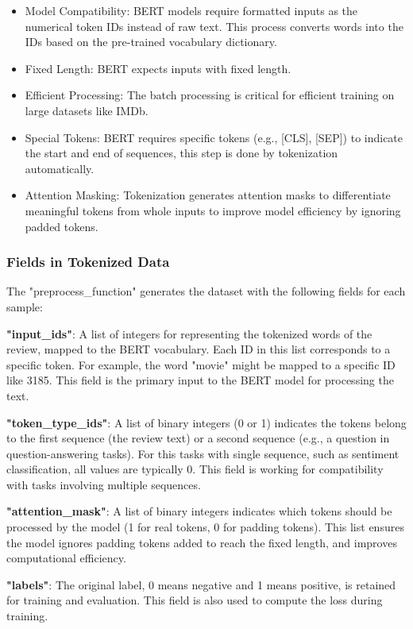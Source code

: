 \begin{itemize}
    \item Model Compatibility: BERT models require formatted inputs as the numerical token IDs instead of raw text. This process converts words into the IDs based on the pre-trained vocabulary dictionary.
    \item Fixed Length: BERT expects inputs with fixed length. 
    \item Efficient Processing: The batch processing is critical for efficient training on large datasets like IMDb.
    \item Special Tokens: BERT requires specific tokens (e.g., [CLS], [SEP]) to indicate the start and end of sequences, this step is done by tokenization automatically.
    \item Attention Masking: Tokenization generates attention masks to differentiate meaningful tokens from whole inputs to improve model efficiency by ignoring padded tokens.
\end{itemize}

\subsubsection*{Fields in Tokenized Data}

The "preprocess\_function" generates the dataset with the following fields for each sample:

\textbf{"input\_ids"}: A list of integers for representing the tokenized words of the review, mapped to the BERT vocabulary. Each ID in this list corresponds to a specific token. For example, the word "movie" might be mapped to a specific ID like 3185. This field is the primary input to the BERT model for processing the text.

\textbf{"token\_type\_ids"}: A list of binary integers (0 or 1) indicates the tokens belong to the first sequence (the review text) or a second sequence (e.g., a question in question-answering tasks). For this tasks with single sequence, such as sentiment classification, all values are typically 0. This field is working for compatibility with tasks involving multiple sequences.

\textbf{"attention\_mask"}: A list of binary integers indicates which tokens should be processed by the model (1 for real tokens, 0 for padding tokens). This list ensures the model ignores padding tokens added to reach the fixed length, and improves computational efficiency.

\textbf{"labels"}: The original label, 0 means negative and 1 means positive, is retained for training and evaluation. This field is also used to compute the loss during training.

